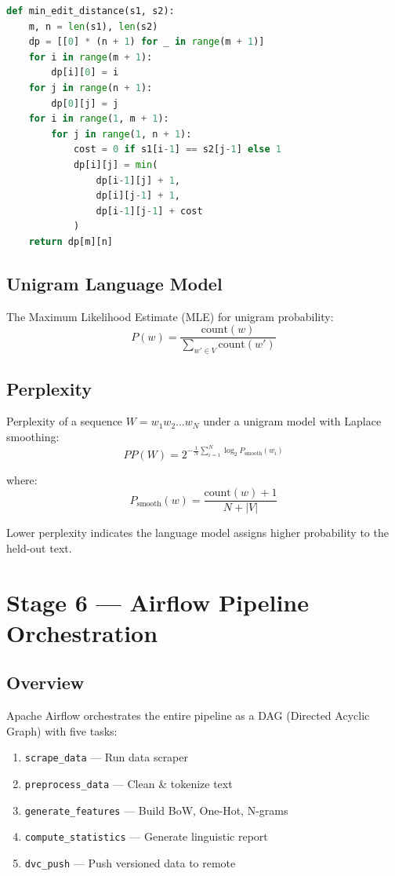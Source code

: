\documentclass[12pt,a4paper]{article}
\begin{document}
\begin{lstlisting}[language=Python,caption={Minimum Edit Distance implementation}]
def min_edit_distance(s1, s2):
    m, n = len(s1), len(s2)
    dp = [[0] * (n + 1) for _ in range(m + 1)]
    for i in range(m + 1):
        dp[i][0] = i
    for j in range(n + 1):
        dp[0][j] = j
    for i in range(1, m + 1):
        for j in range(1, n + 1):
            cost = 0 if s1[i-1] == s2[j-1] else 1
            dp[i][j] = min(
                dp[i-1][j] + 1,
                dp[i][j-1] + 1,
                dp[i-1][j-1] + cost
            )
    return dp[m][n]
\end{lstlisting}

\subsection{Unigram Language Model}

The Maximum Likelihood Estimate (MLE) for unigram probability:
\[
P(w) = \frac{\text{count}(w)}{\sum_{w' \in V} \text{count}(w')}
\]

\subsection{Perplexity}

Perplexity of a sequence $W = w_1 w_2 \ldots w_N$ under a unigram model with Laplace smoothing:
\[
PP(W) = 2^{-\frac{1}{N} \sum_{i=1}^{N} \log_2 P_{\text{smooth}}(w_i)}
\]

where:
\[
P_{\text{smooth}}(w) = \frac{\text{count}(w) + 1}{N + |V|}
\]

Lower perplexity indicates the language model assigns higher probability to the held-out text.

\section{Stage 6 — Airflow Pipeline Orchestration}

\subsection{Overview}

Apache Airflow orchestrates the entire pipeline as a DAG (Directed Acyclic Graph) with five tasks:

\begin{enumerate}
  \item \texttt{scrape\_data} — Run data scraper
  \item \texttt{preprocess\_data} — Clean \& tokenize text
  \item \texttt{generate\_features} — Build BoW, One-Hot, N-grams
  \item \texttt{compute\_statistics} — Generate linguistic report
  \item \texttt{dvc\_push} — Push versioned data to remote
\end{enumerate}
\end{document}
